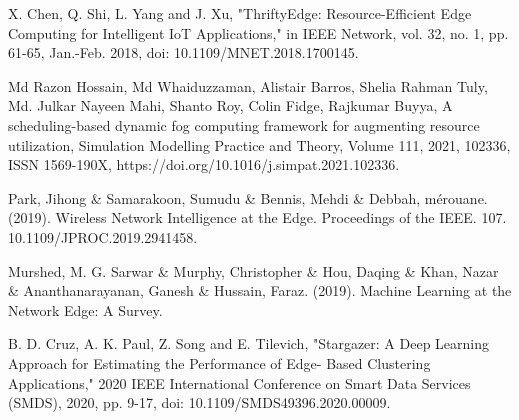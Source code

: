 \documentclass[runningheads]{llncs}
\begin{document}
\begin{thebibliography}{8}
X. Chen, Q. Shi, L. Yang and J. Xu, "ThriftyEdge: Resource-Efficient Edge Computing for Intelligent IoT Applications," in IEEE Network, vol. 32, no. 1, pp. 61-65, Jan.-Feb. 2018, doi: 10.1109/MNET.2018.1700145.


Md Razon Hossain, Md Whaiduzzaman, Alistair Barros, Shelia Rahman Tuly, Md. Julkar Nayeen Mahi, Shanto Roy, Colin Fidge, Rajkumar Buyya,
A scheduling-based dynamic fog computing framework for augmenting resource utilization,
Simulation Modelling Practice and Theory,
Volume 111, 2021, 102336, ISSN 1569-190X,
https://doi.org/10.1016/j.simpat.2021.102336.


Park, Jihong \& Samarakoon, Sumudu \& Bennis, Mehdi \& Debbah, mérouane. (2019). Wireless Network Intelligence at the Edge. Proceedings of the IEEE. 107. 10.1109/JPROC.2019.2941458. 


Murshed, M. G. Sarwar \& Murphy, Christopher \& Hou, Daqing \& Khan, Nazar \& Ananthanarayanan, Ganesh \& Hussain, Faraz. (2019). Machine Learning at the Network Edge: A Survey. 


B. D. Cruz, A. K. Paul, Z. Song and E. Tilevich, "Stargazer: A Deep Learning Approach for Estimating the Performance of Edge- Based Clustering Applications," 2020 IEEE International Conference on Smart Data Services (SMDS), 2020, pp. 9-17, doi: 10.1109/SMDS49396.2020.00009.



\end{thebibliography}
\end{document}

